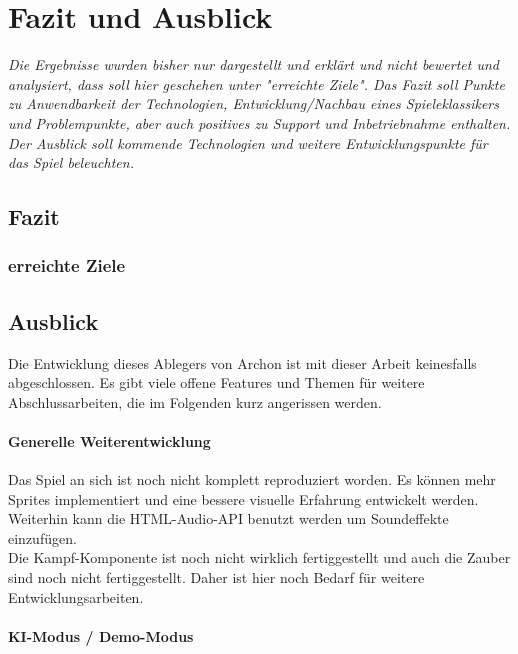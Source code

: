 
\chapter{Fazit und Ausblick}
\label{cha:fazit}

\emph{Die Ergebnisse wurden bisher nur dargestellt und erklärt und nicht bewertet und analysiert, dass soll hier geschehen unter "erreichte Ziele". Das Fazit soll Punkte zu Anwendbarkeit der Technologien, Entwicklung/Nachbau eines Spieleklassikers und Problempunkte, aber auch positives zu Support und Inbetriebnahme enthalten. Der Ausblick soll kommende Technologien und weitere Entwicklungspunkte für das Spiel beleuchten.}

\section{Fazit}
\label{sec:Schlussfolgerung}

\subsection{erreichte Ziele}
\label{subsec:erreichte_ziele}

\section{Ausblick}
\label{sec:Ausblick}

Die Entwicklung dieses Ablegers von Archon ist mit dieser Arbeit keinesfalls abgeschlossen. Es gibt viele offene Features und Themen für weitere Abschlussarbeiten, die im Folgenden kurz angerissen werden.

\subsubsection{Generelle Weiterentwicklung}

Das Spiel an sich ist noch nicht komplett reproduziert worden. Es können mehr Sprites implementiert und eine bessere visuelle Erfahrung entwickelt werden.\\
Weiterhin kann die HTML-Audio-API benutzt werden um Soundeffekte einzufügen.\\
Die Kampf-Komponente ist noch nicht wirklich fertiggestellt und auch die Zauber sind noch nicht fertiggestellt. Daher ist hier noch Bedarf für weitere Entwicklungsarbeiten.

\subsubsection{KI-Modus / Demo-Modus}

